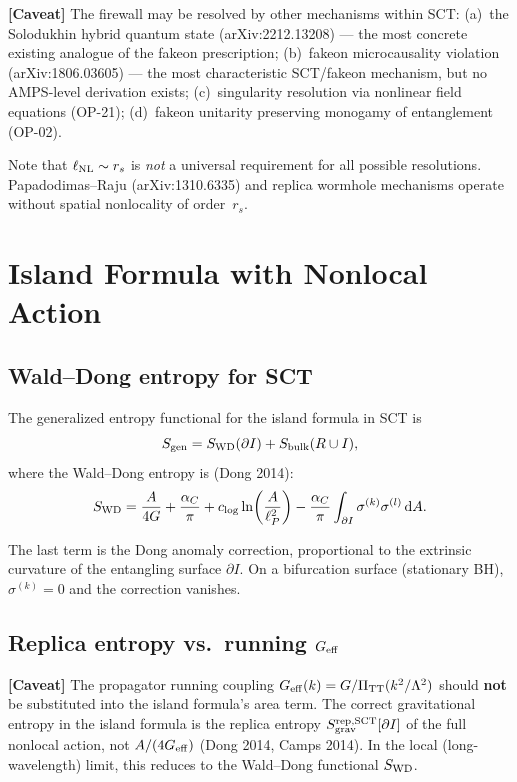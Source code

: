 \documentclass[11pt,a4paper]{article}
\renewcommand{\dd}{\mathrm{d}}
\newcommand{\PiTT}{\Pi_{\mathrm{TT}}}
\theoremstyle{plain}
\theoremstyle{definition}
\newcommand{\caveat}[1]{%
  \par\smallskip\noindent
  \colorbox{yellow!15}{\parbox{\dimexpr\linewidth-2\fboxsep}{%
    \textcolor{orange!70!black}{\textbf{[Caveat]}} #1}}%
  \par\smallskip}
\begin{document}
\caveat{The firewall may be resolved by other mechanisms within SCT:
  (a)~the Solodukhin hybrid quantum state (arXiv:2212.13208) --- the
  most concrete existing analogue of the fakeon prescription;
  (b)~fakeon microcausality violation (arXiv:1806.03605) --- the most
  characteristic SCT/fakeon mechanism, but no AMPS-level derivation exists;
  (c)~singularity resolution via nonlinear field equations (OP-21);
  (d)~fakeon unitarity preserving monogamy of entanglement (OP-02).

  Note that $\ell_{\rm NL} \sim r_s$ is \emph{not} a universal
  requirement for all possible resolutions.  Papadodimas--Raju
  (arXiv:1310.6335) and replica wormhole mechanisms operate without
  spatial nonlocality of order~$r_s$.}


\section{Island Formula with Nonlocal Action}
\label{sec:island}

\subsection{Wald--Dong entropy for SCT}

The generalized entropy functional for the island formula in SCT is
\begin{equation}
\label{eq:gen-entropy}
S_{\rm gen} = S_{\rm WD}(\partial I) + S_{\rm bulk}(R \cup I),
\end{equation}
where the Wald--Dong entropy is (Dong 2014):
\begin{equation}
\label{eq:wald-dong}
S_{\rm WD} = \frac{A}{4G}
  + \frac{\alpha_C}{\pi}
  + c_{\log}\ln\!\left(\frac{A}{\ell_P^2}\right)
  - \frac{\alpha_C}{\pi}\int_{\partial I}
    \sigma^{(k)}\sigma^{(l)}\,\dd A.
\end{equation}

The last term is the Dong anomaly correction, proportional to the
extrinsic curvature of the entangling surface $\partial I$.  On a
bifurcation surface (stationary BH), $\sigma^{(k)} = 0$ and the
correction vanishes.

\subsection{Replica entropy vs.\ running $G_{\rm eff}$}

\caveat{The propagator running coupling
  $G_{\rm eff}(k) = G/\PiTT(k^2/\Lambda^2)$ should \textbf{not}
  be substituted into the island formula's area term.  The correct
  gravitational entropy in the island formula is the replica entropy
  $S_{\rm grav}^{\rm rep,SCT}[\partial I]$ of the full nonlocal action,
  not $A/(4G_{\rm eff})$ (Dong 2014, Camps 2014).  In the local
  (long-wavelength) limit, this reduces to the Wald--Dong functional
  $S_{\rm WD}$.}
\end{document}
